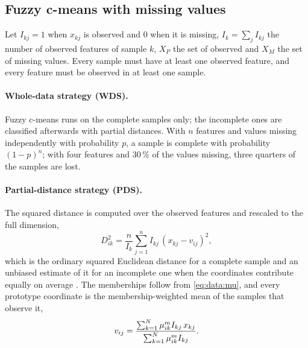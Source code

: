 \subsection{Fuzzy c-means with missing values}\label{sec:data:incomplete}

Let $I_{kj}=1$ when $x_{kj}$ is observed and $0$ when it is missing, $I_k=\sum_jI_{kj}$ the number of observed features of sample $k$, $X_P$ the set of observed and $X_M$ the set of missing values. Every sample must have at least one observed feature, and every feature must be observed in at least one sample.

\paragraph{Whole-data strategy (WDS).} Fuzzy c-means runs on the complete samples only; the incomplete ones are classified afterwards with partial distances. With $n$ features and values missing independently with probability $p$, a sample is complete with probability $(1-p)^n$; with four features and $30\,\%$ of the values missing, three quarters of the samples are lost.

\paragraph{Partial-distance strategy (PDS).} The squared distance is computed over the observed features and rescaled to the full dimension,
\begin{equation}
  D^2_{ik}=\frac{n}{I_k}\sum_{j=1}^{n}I_{kj}\,(x_{kj}-v_{ij})^2 ,
  \label{eq:data:pds}
\end{equation}
which is the ordinary squared Euclidean distance for a complete sample and an unbiased estimate of it for an incomplete one when the coordinates contribute equally on average \cite{dixon:1979:missing}. The memberships follow from \eqref{eq:data:mu}, and every prototype coordinate is the membership-weighted mean of the samples that observe it,
\begin{equation}
  v_{ij}=\frac{\sum_{k=1}^{N}\mu_{ik}^m I_{kj}\,x_{kj}}{\sum_{k=1}^{N}\mu_{ik}^m I_{kj}} .
  \label{eq:data:pdsv}
\end{equation}

